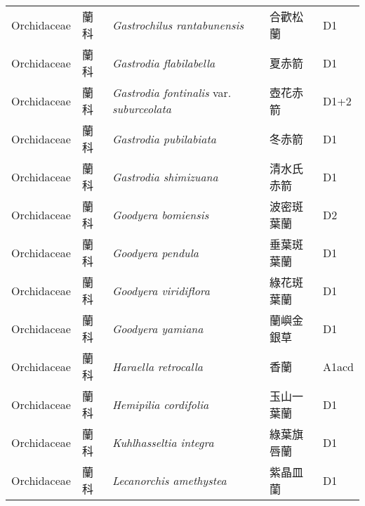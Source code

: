 {\begin{longtable}{p{2.5cm}p{2.5cm}p{4.5cm}p{2.5cm}p{3cm}}
    Orchidaceae & 蘭科 & \textit{Gastrochilus rantabunensis}  & 合歡松蘭 & D1 \index{Gastrochilus@\textit{Gastrochilus}!rantabunensis@\textit{rantabunensis}}  \index{合歡松蘭} \\
    Orchidaceae & 蘭科 & \textit{Gastrodia flabilabella}  & 夏赤箭 & D1 \index{Gastrodia@\textit{Gastrodia}!flabilabella@\textit{flabilabella}}  \index{夏赤箭} \\
    Orchidaceae & 蘭科 & \textit{Gastrodia fontinalis} var. \textit{suburceolata}  & 壺花赤箭 & D1+2 \index{Gastrodia@\textit{Gastrodia}!fontinalis@\textit{fontinalis}!var. suburceolata@var. \textit{suburceolata}}  \index{壺花赤箭} \\
    Orchidaceae & 蘭科 & \textit{Gastrodia pubilabiata}  & 冬赤箭 & D1 \index{Gastrodia@\textit{Gastrodia}!pubilabiata@\textit{pubilabiata}}  \index{冬赤箭} \\
    Orchidaceae & 蘭科 & \textit{Gastrodia shimizuana}  & 清水氏赤箭 & D1 \index{Gastrodia@\textit{Gastrodia}!shimizuana@\textit{shimizuana}}  \index{清水氏赤箭} \\
    Orchidaceae & 蘭科 & \textit{Goodyera bomiensis}  & 波密斑葉蘭 & D2 \index{Goodyera@\textit{Goodyera}!bomiensis@\textit{bomiensis}}  \index{波密斑葉蘭} \\
    Orchidaceae & 蘭科 & \textit{Goodyera pendula}  & 垂葉斑葉蘭 & D1 \index{Goodyera@\textit{Goodyera}!pendula@\textit{pendula}}  \index{垂葉斑葉蘭} \\
    Orchidaceae & 蘭科 & \textit{Goodyera viridiflora}  & 綠花斑葉蘭 & D1 \index{Goodyera@\textit{Goodyera}!viridiflora@\textit{viridiflora}}  \index{綠花斑葉蘭} \\
    Orchidaceae & 蘭科 & \textit{Goodyera yamiana}  & 蘭嶼金銀草 & D1 \index{Goodyera@\textit{Goodyera}!yamiana@\textit{yamiana}}  \index{蘭嶼金銀草} \\
    Orchidaceae & 蘭科 & \textit{Haraella retrocalla}  & 香蘭 & A1acd \index{Haraella@\textit{Haraella}!retrocalla@\textit{retrocalla}}  \index{香蘭} \\
    Orchidaceae & 蘭科 & \textit{Hemipilia cordifolia}  & 玉山一葉蘭 & D1 \index{Hemipilia@\textit{Hemipilia}!cordifolia@\textit{cordifolia}}  \index{玉山一葉蘭} \\
    Orchidaceae & 蘭科 & \textit{Kuhlhasseltia integra}  & 綠葉旗唇蘭 & D1 \index{Kuhlhasseltia@\textit{Kuhlhasseltia}!integra@\textit{integra}}  \index{綠葉旗唇蘭} \\
    Orchidaceae & 蘭科 & \textit{Lecanorchis amethystea}  & 紫晶皿蘭 & D1 \index{Lecanorchis@\textit{Lecanorchis}!amethystea@\textit{amethystea}}  \index{紫晶皿蘭} \\

\end{longtable}}
